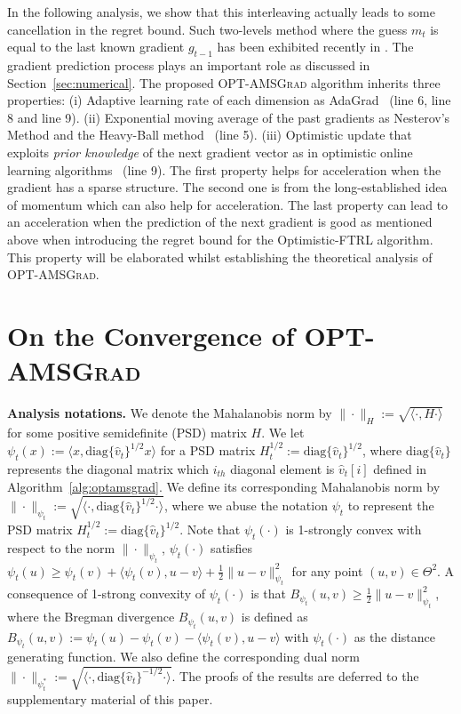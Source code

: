 \documentclass[wcp]{jmlr}
\begin{document}
In the following analysis, we show that this interleaving actually leads to some cancellation in the regret bound.
Such two-levels method where the guess $m_t$ is equal to the last known gradient $g_{t-1}$ has been exhibited recently in \citet{CJ12}.
The gradient prediction process plays an important role as discussed in Section~\ref{sec:numerical}.
The proposed \textsc{OPT-AMSGrad} algorithm inherits three properties: \textsf{(i)} Adaptive learning rate of each dimension as AdaGrad~\citep{DHS11} (line 6, line 8 and line 9). \textsf{(ii)} Exponential moving average of the past gradients as Nesterov's Method \citep{N04} and the Heavy-Ball method~\citep{P64} (line 5). \textsf{(iii)} Optimistic update that exploits \emph{prior knowledge} of the next gradient vector as in optimistic online learning algorithms~\citep{CJ12,RS13b,SALS15} (line 9).
The first property helps for acceleration when the gradient has a sparse structure.
The second one is from the long-established idea of momentum which can also help for acceleration. 
The last property can lead to an acceleration when the prediction of the next gradient is good as mentioned above when introducing the regret bound for the Optimistic-FTRL algorithm.
This property will be elaborated whilst establishing the theoretical analysis of \textsc{OPT-AMSGrad}.




\vspace{-0.05in}
\section{On the Convergence of \textsc{OPT-AMSGrad}}\label{sec:analysis}


\textbf{Analysis notations.}\hspace{0.1in}
We denote the Mahalanobis norm by $\|\cdot\|_H := \sqrt{ \langle \cdot, H \cdot \rangle }$ for some positive semidefinite (PSD) matrix $H$.
We let $\psi_t(x) := \langle x, \text{diag}\{\hat{v}_t\}^{1/2} x \rangle$ for a PSD matrix $H_t^{1/2}:= \text{diag}\{\hat{v}_t\}^{1/2}$, where $\text{diag}\{\hat{v}_t\}$ represents the diagonal matrix which $i_{th}$ diagonal element is $\hat{v}_t[i]$ defined in Algorithm~\ref{alg:optamsgrad}.
We define its corresponding Mahalanobis norm by $\| \cdot \|_{\psi_t}:=  \sqrt{ \langle \cdot, \text{diag}\{\hat{v}_t\}^{1/2} \cdot \rangle }$,
where we abuse the notation $\psi_t$ to represent the PSD matrix $H_t^{1/2}:=\text{diag}\{\hat{v}_t\}^{1/2}$.
Note that $\psi_t(\cdot)$ is 1-strongly convex with respect to the norm $\| \cdot \|_{\psi_t}$, \ie $\psi_t(\cdot)$ satisfies $\psi_t(u) \geq \psi_t(v) + \langle \psi_t(v), u - v \rangle + \frac{1}{2} \| u - v\|^2_{\psi_t}$ for any point $(u,v) \in \Theta^2$.
A consequence of 1-strong convexity of $\psi_t(\cdot)$ is that $B_{\psi_t}(u,v) \geq \frac{1}{2} \| u - v \|^2_{\psi_t}$, where the Bregman divergence $B_{\psi_t}(u,v)$ is defined as $B_{\psi_t}(u,v) := \psi_t(u) - \psi_t(v) - \langle \psi_t(v), u - v \rangle$ with $\psi_t(\cdot)$ as the distance generating function.
We also define the corresponding dual norm $\| \cdot \|_{\psi_t^*}:= \sqrt{ \langle \cdot, \text{diag}\{\hat{v}_t\}^{-1/2} \cdot \rangle }$.
The proofs of the results are deferred to the supplementary material of this paper.
\end{document}
